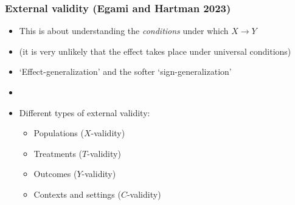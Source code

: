 \documentclass[aspectratio=43]{beamer}
\begin{document}
\begin{frame}
\frametitle{External validity (Egami and Hartman 2023)}
\centering

\begin{itemize}
  \item This is about understanding the \textit{conditions} under which $X \rightarrow Y$
  \item[] {\small (it is very unlikely that the effect takes place under universal conditions)}
  \item<2-> `Effect-generalization' and the softer `sign-generalization'
  \item[]
  \item<3-> Different types of external validity:
  \begin{itemize}
    \item Populations ($X$-validity)
    \item Treatments ($T$-validity)
    \item Outcomes ($Y$-validity)
    \item Contexts and settings ($C$-validity)
  \end{itemize}
\end{itemize}

\end{frame}

\end{document}
